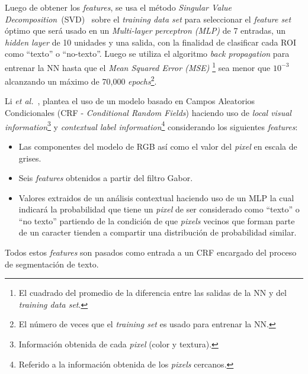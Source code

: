 Luego de obtener los \textit{features}, se usa el método \textit{Singular Value
Decomposition}~(SVD)~\cite{SVD:web} sobre el \textit{training data set} para
seleccionar el \textit{feature set} óptimo que será usado en un
\textit{Multi-layer perceptron (MLP)} de 7 entradas, un \textit{hidden layer} de
10 unidades y una salida, con la finalidad de clasificar cada ROI como ``texto''
o ``no-texto''. Luego se utiliza el algoritmo \textit{back propagation} para
entrenar la NN hasta que el \textit{Mean Squared Error (MSE)} \footnote{El
cuadrado del promedio de la diferencia entre las salidas de la NN y del
\textit{training data set}.} sea menor que $10^{-3}$ alcanzando un máximo de
70,000 \textit{epochs}\footnote{El número de veces que el \textit{training set}
es usado para entrenar la NN.}.

Li \textit{et al.}~\cite{Li:2010:CRFforTS}, plantea el uso de un modelo basado
en Campos Aleatorios Condicionales (CRF - \textit{Conditional Random Fields})
haciendo uso de \textit{local visual information}\footnote{Información obtenida
de cada \textit{pixel} (color y textura).} y \textit{contextual label
information}\footnote{Referido a la información obtenida de los \textit{pixels}
cercanos.} considerando los siguientes \textit{features}:
\begin{itemize}
	\item Las componentes del modelo de RGB así como el valor del \textit{pixel}
en escala de grises.
	\item Seis \textit{features} obtenidos a partir del filtro Gabor.
	\item Valores extraidos de un análisis contextual haciendo uso de un MLP la
cual indicará la probabilidad que tiene un \textit{pixel} de ser considerado
como ``texto'' o ``no texto'' partiendo de la condición de que \textit{pixels}
vecinos que forman parte de un caracter tienden a compartir una distribución de
probabilidad similar.
\end{itemize}

Todos estos \textit{features} son pasados como entrada a un CRF encargado del
proceso de segmentación de texto.

